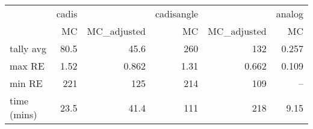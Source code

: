 \begin{tabular}{lrrrrr}
\toprule
{} & cadis &             & cadisangle &             & analog \\
{} &    MC & MC\_adjusted &         MC & MC\_adjusted &     MC \\
\midrule
tally avg   &  80.5 &        45.6 &        260 &         132 &  0.257 \\
max RE      &  1.52 &       0.862 &       1.31 &       0.662 &  0.109 \\
min RE      &   221 &         125 &        214 &         109 &    -- \\
time (mins) &  23.5 &        41.4 &        111 &         218 &   9.15 \\
\bottomrule
\end{tabular}
